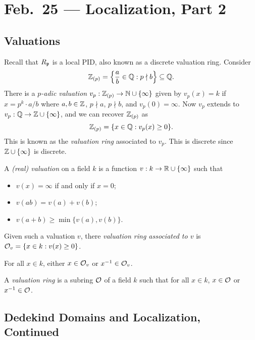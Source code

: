 \chapter{Feb.~25 --- Localization, Part 2}

\section{Valuations}

\begin{example}
  Recall that $R_{\mathfrak{p}}$ is a local PID, also known
  as a discrete valuation ring. Consider
  \[
    \mathbb{Z}_{(p)} = \left\{
      \frac{a}{b} \in \mathbb{Q} : p \nmid b
    \right\} \subseteq \mathbb{Q}.
  \]
  There is a \emph{$p$-adic valuation}
  $v_p : \mathbb{Z}_{(p)} \to \mathbb{N} \cup \{\infty\}$ given by
  $v_p(x) = k$ if $x = p^k \cdot a / b$ where
  $a, b \in \mathbb{Z}$, $p \nmid a$, $p \nmid b$, and
  $v_p(0) = \infty$.
  Now $v_p$ extends to $v_p : \mathbb{Q} \to \mathbb{Z} \cup \{\infty\}$,
  and we can recover $\mathbb{Z}_{(p)}$ as
  \[
    \mathbb{Z}_{(p)} = \{x \in \mathbb{Q} : v_p(x) \ge 0\}.
  \]
  This is known as the \emph{valuation ring} associated
  to $v_p$. This is discrete since
  $\mathbb{Z} \cup \{\infty\}$ is discrete.
\end{example}

\begin{definition}
  A \emph{(real) valuation} on a field $k$ is a function
  $v : k \to \mathbb{R} \cup \{\infty\}$ such that
  \begin{itemize}
    \item $v(x) = \infty$ if and only if $x = 0$;
    \item $v(ab) = v(a) + v(b)$;
    \item $v(a + b) \ge \min\{v(a), v(b)\}$.
  \end{itemize}
\end{definition}
Given such a valuation $v$, there
\emph{valuation ring associated to $v$} is
$\mathcal{O}_v = \{x \in k : v(x) \ge 0\}$.

\begin{lemma}
  For all $x \in k$, either $x \in \mathcal{O}_v$ or
  $x^{-1} \in \mathcal{O}_v$.
\end{lemma}

\begin{definition}
  A \emph{valuation ring} is a subring $\mathcal{O}$
  of a field $k$ such that for all $x \in k$,
  $x \in \mathcal{O}$ or $x^{-1} \in \mathcal{O}$.
\end{definition}

\section{Dedekind Domains and Localization, Continued}

